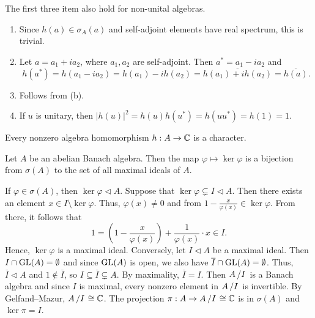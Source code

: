\begin{remark}
  The first three item also hold for non-unital algebras.
\end{remark}

\begin{myproof}
  \begin{enumerate}
    \item Since $h(a) \in \sigma_A(a)$ and self-adjoint elements have real spectrum, this is trivial.
    \item Let $a = a_1 + i a_2$, where $a_1, a_2$ are self-adjoint. Then $a^* = a_1 - i a_2$ and 
    $$h(a^*) = h(a_1 - i a_2) = h(a_1) - i h(a_2) = \overline{h(a_1) + i h(a_2)} = \overline{h(a)}.$$
    \item Follows from (b).
    \item If $u$ is unitary, then $|h(u)|^2 = h(u) h(u^*) = h(u u^*) = h(1) = 1$. \qedhere
  \end{enumerate}
\end{myproof}

\begin{corollary}
  Every nonzero algebra homomorphism $h: A \to \mathbb {C}$ is a character.
\end{corollary}

\begin{proposition}
  Let $A$ be an abelian Banach algebra. Then the map $\varphi \mapsto \ker \varphi$
  is a bijection from $\sigma (A)$ to the set of all maximal ideals of $A$.
\end{proposition}

\begin{myproof}
  If $\varphi \in \sigma (A)$, then $\ker \varphi \lhd A$. Suppose that $\ker \varphi \subsetneq I \lhd A$. Then there exists
  an element $x \in I \setminus \ker \varphi$. Thus, $\varphi(x) \neq 0$ and 
  from $1 - \frac{x}{\varphi(x)} \in \ker \varphi$. From there, it follows that 
  $$1 = \left(1 - \frac{x}{\varphi(x)}\right) + \frac{1}{\varphi(x)} \cdot x \in I.$$
  Hence, $\ker \varphi$ is a maximal ideal.
  Conversely, let $I \lhd A$ be a maximal ideal. Then $I \cap \operatorname{GL}(A) = \emptyset$
  and since $\operatorname{GL}(A)$ is open, we also have $\overline{I} \cap \operatorname{GL}(A) = \emptyset$.
  Thus, $\overline{I} \lhd A$ and $1 \notin \overline{I}$, so $I \subseteq \overline{I} \subsetneq A$.
  By maximality, $\overline{I} = I$. Then $\quot{A}{I}$ is a Banach algebra and since $I$ is maximal,
  every nonzero element in $\quot{A}{I}$ is invertible. By Gelfand--Mazur, $\quot{A}{I} \cong \C$.
  The projection $\pi: A \to \quot{A}{I} \cong \C$ is in $\sigma (A)$ and $\ker \pi = I$.
\end{myproof}


